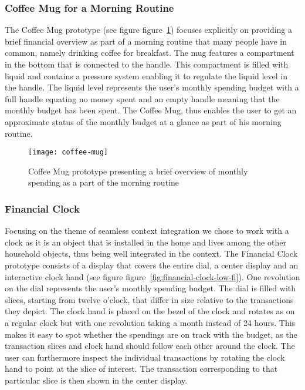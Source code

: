 \subsubsection*{Coffee Mug for a Morning Routine}
The Coffee Mug prototype (see figure figure~\ref{fig:coffee-mug}) focuses explicitly on providing a brief financial overview as part of a morning routine that many people have in common, namely drinking coffee for breakfast. The mug features a compartment in the bottom that is connected to the handle. This compartment is filled with liquid and contains a pressure system enabling it to regulate the liquid level in the handle. The liquid level represents the user’s monthly spending budget with a full handle equating no money spent and an empty handle meaning that the monthly budget has been spent. The Coffee Mug, thus enables the user to get an approximate status of the monthly budget at a glance as part of his morning routine.

\begin{figure}[h]
	\centering
	\texttt{[image: coffee-mug]}
	\caption{Coffee Mug prototype presenting a brief overview of monthly spending as a part of the morning routine}
	\label{fig:coffee-mug}
\end{figure}

\subsubsection*{Financial Clock}
\label{sec:financial-clock-concept}
Focusing on the theme of seamless context integration we chose to work with a clock as it is an object that is installed in the home and lives among the other household objects, thus being well integrated in the context. The Financial Clock prototype consists of a display that covers the entire dial, a center display and an interactive clock hand (see figure figure~\ref{fig:financial-clock-low-fi}). One revolution on the dial represents the user’s monthly spending budget. The dial is filled with slices, starting from twelve o’clock, that differ in size relative to the transactions they depict. The clock hand is placed on the bezel of the clock and rotates as on a regular clock but with one revolution taking a month instead of 24 hours. This makes it easy to spot whether the spendings are on track with the budget, as the transaction slices and clock hand should follow each other around the clock. The user can furthermore inspect the individual transactions by rotating the clock hand to point at the slice of interest. The transaction corresponding to that particular slice is then shown in the center display.

